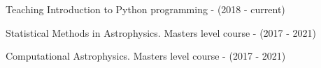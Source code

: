 \begin{rubric}{Teaching}
%
Introduction to Python programming - (2018 - current) \par
{}%
Statistical Methods in Astrophysics. Masters level course - (2017 - 2021) \par
{}%
Computational Astrophysics. Masters level course - (2017 - 2021) \par

 \par

%
%
\end{rubric}